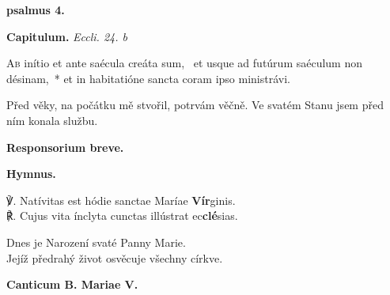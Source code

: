 \documentclass[a4paper, twoside, 12pt]{article}
\newcommand{\titCapitulum}[1]{\hfill \textit{#1}}
\newcommand{\hicSuntNeumae}{\vspace{1.3cm}}
\newcommand{\pars}[1]{\textbf{#1}}
\begin{document}


\pagebreak

\pars{psalmus 4.}

\hicSuntNeumae
{}



\pagebreak

\raggedcolumns

\pars{Capitulum.} \titCapitulum{Eccli. 24. b} \label{capitulum}
\begin{multicols}{2}
\lettrine{A}{b} inítio et ante saécula creáta sum,~\dag\mbox{}
et usque ad futúrum saéculum non désinam,~*
et in habitatióne sancta coram ipso ministrávi.

\columnbreak

Před věky, na počátku mě stvořil,
potrvám věčně. 
Ve svatém Stanu jsem před ním konala službu.
\end{multicols}

\pars{Responsorium breve.}


\pars{Hymnus.}



\label{versus}
\begin{multicols}{2}
℣. Natívitas est hódie sanctae Maríae \textbf{Vír}ginis.\\
\indent ℟. Cujus vita ínclyta cunctas illústrat ec\textbf{clé}sias.

\columnbreak

Dnes je Narození svaté Panny Marie.\\
\indent Jejíž předrahý život osvěcuje všechny církve.
\end{multicols}

\pars{Canticum B. Mariae V.}

\hicSuntNeumae
{}
\end{document}
